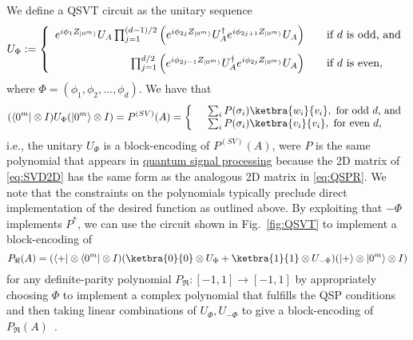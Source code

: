 \begin{refsection}
We define a QSVT circuit as the unitary sequence
\begin{equation}
		U_\Phi:=\left\{\begin{array}{rcl} \underset{\phantom{\sum}}{ e^{i\phi_1 Z_{\lvert0^m\rangle}}U_A}
		\prod_{j=1}^{(d-1)/2}\left(e^{i\phi_{2j} Z_{\lvert0^m\rangle}} U_A^\dagger e^{i\phi_{2j+1} Z_{\lvert0^m\rangle}} U_A\right) & &\text{if }d\text{ is odd, and}\\
		\prod_{j=1}^{d/2}\left(e^{i\phi_{2j-1} Z_{\lvert0^m\rangle}} U_A^\dagger e^{i\phi_{2j} Z_{\lvert0^m\rangle}} U_A \right)& & \text{if }d\text{ is even,}\end{array}\right.
\end{equation}
where $\Phi = (\phi_1,\phi_2,\ldots,\phi_d)$.
We have that
\begin{align}
    (\bra{0^m} \otimes I) U_\Phi (\ket{0^m} \otimes I) =P^{(SV)}(A) = \left\{\begin{array}{rl} &\sum_i P(\sigma_i) \ketbra{w_i}{v_i}, \text{ for odd $d$, and} \\
 &\sum_i P(\sigma_i) \ketbra{v_i}{v_i}, \text{ for even $d$,} \end{array}\right. 
\end{align}
i.e., the unitary $U_\Phi$ is a block-encoding of $P^{(SV)}(A)$, were $P$ is the same polynomial that appears in \hyperref[prim:QSP]{quantum signal processing} because the 2D matrix of \eqref{eq:SVD2D} has the same form as the analogous 2D matrix in \eqref{eq:QSPR}.
We note that the constraints on the polynomials typically preclude direct implementation of the desired function as outlined above. By exploiting that $-\Phi$ implements $P^*$, we can use the circuit shown in Fig.~\ref{fig:QSVT} to implement a block-encoding of
\begin{equation}
    P_\Re(A) = (\bra{+} \otimes \bra{0^m} \otimes I) (\ketbra{0}{0} \otimes U_\Phi + \ketbra{1}{1} \otimes U_{-\Phi}) (\ket{+} \otimes \ket{0^m} \otimes I) 
\end{equation}
for any definite-parity polynomial $P_\Re\colon [-1,1]\rightarrow [-1,1]$ by appropriately choosing $\Phi$ to implement a complex polynomial that fulfills the QSP conditions and then taking linear combinations of $U_{\Phi}, U_{-\Phi}$ to give a block-encoding of $P_\Re(A)$~\cite{gilyen2018QSingValTransf,martyn2021GrandUnificationQAlgs,dong2020efficientPhaseFindingInQSP}.



\end{refsection}
